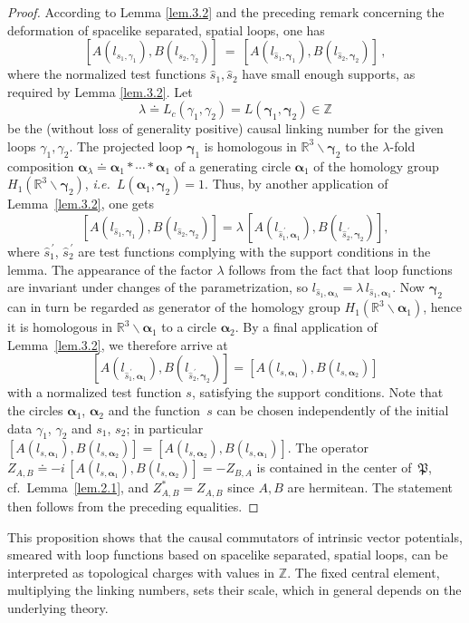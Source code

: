 \documentclass[11pt]{article}
\numberwithin{equation}{section}
\newcommand{\RR}{{\mathbb R}}
\newcommand{\ZZ}{{\mathbb Z}}
\newcommand{\balpha}{{\bm \alpha}}
\newcommand{\bgamma}{{\bm \gamma}}
\newcommand{\fP}{{\mathfrak P}}
\def\ie{{\it i.e.\ }}
\begin{document}
\begin{proof}
According to Lemma \ref{lem.3.2} and the preceding 
remark concerning the deformation of spacelike separated,
spatial loops, one has 
$$ [ A(l_{s_1,\gamma_1}) , B(l_{s_2,\gamma_2}) ] 
\ = \ [ A(l_{\widehat s_1,\bgamma_1}) , B(l_{\widehat s_2,\bgamma_2}) ] \, ,
$$
where the normalized test functions $\widehat s_1, \widehat s_2$ 
have small enough supports, as required by Lemma \ref{lem.3.2}. Let 
$$
\lambda \doteq L_c(\gamma_1,\gamma_2) = 
L(\bgamma_1, \bgamma_2) \in \ZZ 
$$ 
be the (without loss of generality positive) 
causal linking number for the given 
loops $ \gamma _1,  \gamma _2$. The
projected loop $\bgamma_1$ is homologous in 
$\RR^3 \backslash \bgamma_2$ to the 
$\lambda$-fold composition $\balpha_\lambda  
\doteq \balpha_1*\cdots* \balpha_1$ 
of a generating circle 
$\balpha_1$ of the homology group $H_1(\RR^3 \backslash \bgamma_2)$,  
\ie $L(\balpha_1, \bgamma_2) = 1$. 
Thus, by another application of Lemma~\ref{lem.3.2}, one gets  
$$
 [ A(l_{\widehat s_1, \bgamma_1}) , B(l_{\widehat s_2,\bgamma_2}) ] 
= \lambda \, [ A(l_{{\widehat s}^{\, \prime}_1, \balpha_1}) , 
B(l_{{\widehat s}^{\, \prime}_2,\bgamma_2})] ,
$$
where ${\widehat s}^{\, \prime}_1$, ${\widehat s}^{\, \prime}_2$
are test functions
complying with the support conditions in the lemma.
The appearance of the factor $\lambda$ follows from the fact 
that loop functions are invariant under changes of the parametrization, 
so \mbox{$l_{\widehat s_1,\balpha_\lambda} = \lambda \, l_{\widehat s_1,\balpha_1}$}. 
Now $\bgamma_2$ can in turn be regarded as generator of 
the homology group $H_1(\RR^3 \backslash \balpha_1)$, hence it 
is homologous in  $\RR^3 \backslash \balpha_1$
to a circle $\balpha_2$. By a final application of 
Lemma~\ref{lem.3.2}, we therefore arrive at 
$$
[ A(l_{{\widehat s}^{\, \prime}_1, \balpha_1}) , 
B(l_{{\widehat s}^{\, \prime}_2, \bgamma_2})]
= [ A(l_{s , \balpha_1}) , 
B(l_{s ,\balpha_2})] 
$$
with a normalized test function $s$, 
satisfying the support conditions. 
Note that the circles $\balpha_1$, $\balpha_2$   
and the function~$s$ can be chosen independently of 
the initial data $\gamma_1$, $\gamma_2$ and $s_1$, $s_2$; in particular 
$[ A(l_{s, \balpha_1}) , B(l_{s, \balpha_2})] = [ A(l_{s, \balpha_2}) , B(l_{s, \balpha_1})]$.
The operator 
\mbox{$Z_{A,B} \doteq -i \, [ A(l_{s , \balpha_1}) , B(l_{s ,\balpha_2})] 
= - Z_{B,A}$} is contained in the center
of~$\fP$, cf.\ Lemma~\ref{lem.2.1}, and 
$Z_{A,B}^* = Z_{A,B}$ since $A,B$ are hermitean.
The statement then follows from the preceding equalities. 
\end{proof}
%
This proposition shows that the causal commutators of intrinsic
vector potentials, smeared with loop functions based on 
spacelike separated, spatial loops, 
can be interpreted as topological charges with values
in $\ZZ$. The fixed central element, multiplying the 
linking numbers, sets their scale, which in general depends on
the underlying theory.
\end{document}
